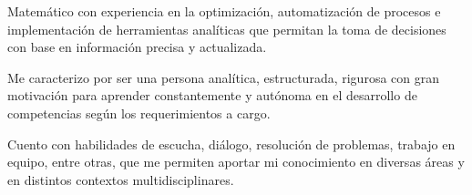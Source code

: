 







Matemático con experiencia en la optimización, automatización de procesos e implementación de herramientas analíticas que permitan la toma de decisiones con base en información precisa y actualizada. 

Me caracterizo por ser una persona analítica, estructurada, rigurosa con gran motivación para aprender constantemente y autónoma en el desarrollo de competencias según los requerimientos a cargo. 

Cuento con habilidades de escucha, diálogo, resolución de problemas, trabajo en equipo, entre otras, que me permiten aportar mi conocimiento en diversas áreas y en distintos contextos multidisciplinares.
